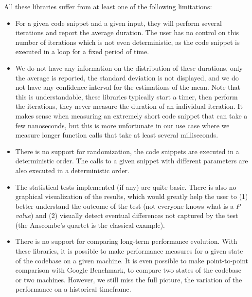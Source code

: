                 All these libraries suffer from at least one of the following limitations:
                \begin{itemize}
                    \item For a given code snippet and a given input, they will perform several iterations and report
                        the average duration. The user has no control on this number of iterations which is not even
                        deterministic, as the code snippet is executed in a loop for a fixed period of time.
                    \item We do not have any information on the distribution of these durations, only the average is
                        reported, the standard deviation is not displayed, and we do not have any confidence interval for
                        the estimations of the mean. Note that this is understandable, these libraries typically start a
                        timer, then perform the iterations, they never measure the duration of an individual iteration.
                        It makes sense when measuring an extremely short code snippet that can take a few nanoseconds,
                        but this is more unfortunate in our use case where we measure longer function calls that take at
                        least several milliseconds.
                    \item There is no support for randomization, the code snippets are executed in a deterministic
                        order.  The calls to a given snippet with different parameters are also executed in a
                        deterministic order.
                    \item The statistical tests implemented (if any) are quite basic.  There is also no graphical
                        visualization of the results, which would greatly help the user to (1) better understand the
                        outcome of the test (not everyone knows what is a \emph{P-value}) and (2) visually detect
                        eventual differences not captured by the test (the Anscombe's quartet is the classical example).
                    \item There is no support for comparing long-term performance evolution. With these libraries, it
                        is possible to make performance measures for a given state of the codebase on a given machine.
                        It is even possible to make point-to-point comparison with Google Benchmark, \ie to compare two
                        states of the codebase or two machines. However, we still miss the full picture, the variation
                        of the performance on a historical timeframe.
                \end{itemize}

